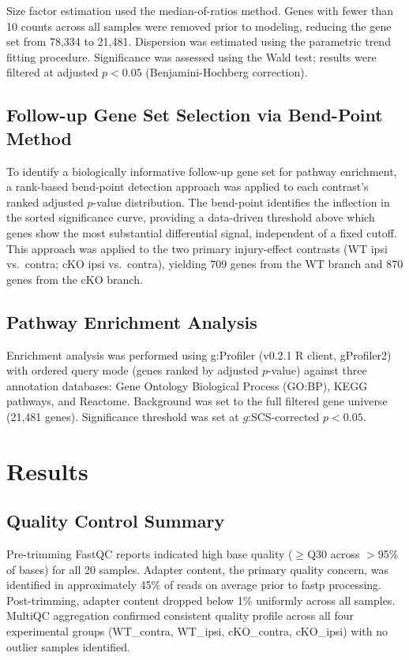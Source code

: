\documentclass[conference]{IEEEtran}
\begin{document}
Size factor estimation used the median-of-ratios method. Genes with fewer than 10 counts across all samples were removed prior to modeling, reducing the gene set from 78,334 to 21,481. Dispersion was estimated using the parametric trend fitting procedure. Significance was assessed using the Wald test; results were filtered at adjusted $p < 0.05$ (Benjamini-Hochberg correction).

\subsection{Follow-up Gene Set Selection via Bend-Point Method}

To identify a biologically informative follow-up gene set for pathway enrichment, a rank-based bend-point detection approach was applied to each contrast's ranked adjusted $p$-value distribution. The bend-point identifies the inflection in the sorted significance curve, providing a data-driven threshold above which genes show the most substantial differential signal, independent of a fixed cutoff. This approach was applied to the two primary injury-effect contrasts (WT ipsi vs.\ contra; cKO ipsi vs.\ contra), yielding 709 genes from the WT branch and 870 genes from the cKO branch.

\subsection{Pathway Enrichment Analysis}

Enrichment analysis was performed using g:Profiler (v0.2.1 R client, gProfiler2)~\cite{raudvere2019} with ordered query mode (genes ranked by adjusted $p$-value) against three annotation databases: Gene Ontology Biological Process (GO:BP), KEGG pathways, and Reactome. Background was set to the full filtered gene universe (21,481 genes). Significance threshold was set at $g$:SCS-corrected $p < 0.05$.

\section{Results}

\subsection{Quality Control Summary}

Pre-trimming FastQC reports indicated high base quality ($\geq$Q30 across $>$95\% of bases) for all 20 samples. Adapter content, the primary quality concern, was identified in approximately 45\% of reads on average prior to fastp processing. Post-trimming, adapter content dropped below 1\% uniformly across all samples. MultiQC aggregation confirmed consistent quality profile across all four experimental groups (WT\_contra, WT\_ipsi, cKO\_contra, cKO\_ipsi) with no outlier samples identified.
\end{document}
